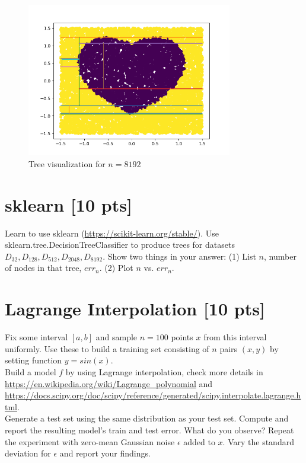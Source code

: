 \documentclass[a4paper]{article}
\theoremstyle{definition}
\newenvironment{soln}{
    \leavevmode\color{blue}\ignorespaces
}{}
\begin{document}
\begin{soln}
    \begin{figure}[H]
      \centering
      \includegraphics[width=0.8\textwidth]{../plots/dbig_8192.png}
      \caption{Tree visualization for $n = 8192$}
      \label{fig:dbig_8192}
    \end{figure}
  \end{soln} 

\section{sklearn [10 pts]}
Learn to use sklearn (\url{https://scikit-learn.org/stable/}).
Use sklearn.tree.DecisionTreeClassifier to produce trees for datasets $D_{32}, D_{128}, D_{512}, D_{2048}, D_{8192}$.  Show two things in your answer: (1) List $n$, number of nodes in that tree, $err_n$. (2) Plot $n$ vs. $err_n$.

\section{Lagrange Interpolation [10 pts]}
Fix some interval $[a, b]$ and sample $n = 100$ points $x$ from this interval uniformly. Use these to build a training set consisting of $n$ pairs $(x, y)$ by setting function $y = sin(x)$. \\

Build a model $f$ by using Lagrange interpolation, check more details in \url{https://en.wikipedia.org/wiki/Lagrange_polynomial} and \url{https://docs.scipy.org/doc/scipy/reference/generated/scipy.interpolate.lagrange.html}. \\

Generate a test set using the same distribution as your test set. Compute and report the resulting model’s train and test error. What do you observe?
Repeat the experiment with zero-mean Gaussian noise $\epsilon$ added to $x$. Vary the standard deviation for $\epsilon$ and report your findings.


\end{document}
